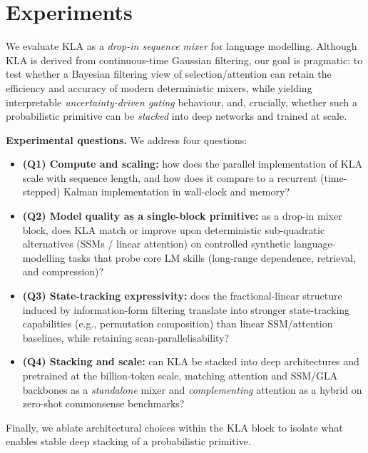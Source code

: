 \documentclass{article}
\newcommand{\our}{\textsc{KLA}\xspace}
\begin{document}

\section{Experiments}
We evaluate \textsc{KLA} as a \emph{drop-in sequence mixer} for language modelling.
Although \textsc{KLA} is derived from continuous-time Gaussian filtering, our goal is pragmatic: to test whether a Bayesian filtering view of selection/attention can retain the efficiency and accuracy of modern deterministic mixers, while yielding interpretable \emph{uncertainty-driven gating} behaviour, and, crucially, whether such a probabilistic primitive can be \emph{stacked} into deep networks and trained at scale.

\noindent\textbf{Experimental questions.}
We address four questions:
\begin{itemize}[leftmargin=1.5em,itemsep=2pt,topsep=2pt,parsep=0pt]
\item \textbf{(Q1) Compute and scaling:} how does the parallel implementation of \textsc{KLA} scale with sequence length, and how does it compare to a recurrent (time-stepped) Kalman implementation in wall-clock and memory?
\item \textbf{(Q2) Model quality as a single-block primitive:} as a drop-in mixer block, does \textsc{KLA} match or improve upon deterministic sub-quadratic alternatives (SSMs / linear attention) on controlled synthetic language-modelling tasks that probe core LM skills (long-range dependence, retrieval, and compression)?
\item \textbf{(Q3) State-tracking expressivity:} does the fractional-linear structure induced by information-form filtering translate into stronger state-tracking capabilities (e.g., permutation composition) than linear SSM/attention baselines, while retaining scan-parallelisability?
\item \textbf{(Q4) Stacking and scale:} can \textsc{KLA} be stacked into deep architectures and pretrained at the billion-token scale, matching attention and SSM/GLA backbones as a \emph{standalone} mixer and \emph{complementing} attention as a hybrid on zero-shot commonsense benchmarks?
\end{itemize}
Finally, we ablate architectural choices within the \our block to isolate what enables stable deep stacking of a probabilistic primitive.
\end{document}
